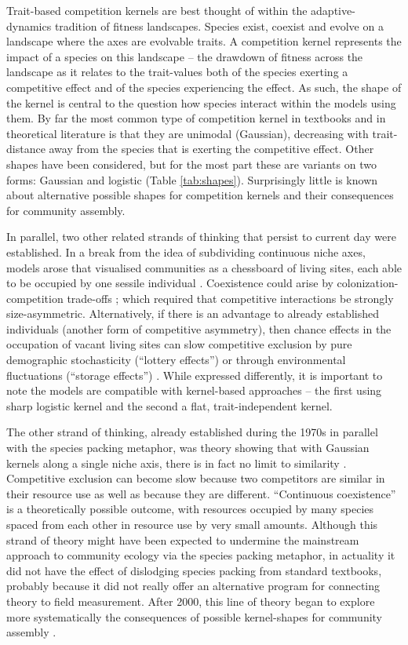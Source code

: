 \documentclass[a4paper,11pt]{article}
\begin{document}
Trait-based competition kernels are best thought of within the adaptive-
dynamics tradition of fitness landscapes. Species exist, coexist and evolve on
a landscape where the axes are evolvable traits. A competition kernel
represents the impact of a species on this landscape -- the drawdown of
fitness across the landscape as it relates to the trait-values both of the
species exerting a competitive effect and of the species experiencing the
effect. As such, the shape of the kernel is central
to the question how species interact within the models using them.
 By far the most common type of
competition kernel in textbooks and in theoretical literature is that they are
unimodal (Gaussian), decreasing with trait-distance away from the species that
is exerting the competitive effect. Other shapes have been considered,
but for the most part these are variants on two forms: Gaussian and logistic
(Table \ref{tab:shapes}). Surprisingly little is known about
alternative possible shapes for competition kernels and their consequences for
community assembly.

In parallel, two other related strands of thinking that persist to current
day were established. In a break from the idea of subdividing continuous
niche axes, models arose
that visualised communities as a chessboard of living sites, each able to be
occupied by one sessile individual \citep{Yodzis-1978}. Coexistence could
arise by colonization-competition trade-offs \citep{Levins-1971,
Geritz-1999, Calcagno-2006}; which required that competitive interactions
be strongly size-asymmetric. Alternatively, if there is an advantage to 
already established individuals (another form of competitive asymmetry),
then chance effects in the occupation of vacant living sites can slow
competitive exclusion by pure demographic stochasticity (``lottery
effects'')
\citep {Sale-1977, Hubbell-2001} or through environmental fluctuations
(``storage effects'') \citep{Chesson-1981}. While expressed differently,
it is important to note the models are compatible with kernel-based 
approaches -- the first using sharp logistic kernel and the second a 
flat, trait-independent kernel. 

The other strand of thinking, already established during the 1970s in parallel
with the species packing metaphor, was theory showing that with Gaussian
kernels along a single niche axis, there is in fact no limit to similarity
\citep{May-1972, Abrams-1975, Abrams-1983}. Competitive exclusion can become
slow because two competitors are similar in their resource use as well as
because they are different. ``Continuous coexistence'' is a theoretically
possible outcome, with resources occupied by many species spaced from each
other in resource use by very small amounts. Although this strand of theory
might have been expected to undermine the mainstream approach to community
ecology via the species packing metaphor, in actuality it did not have the
effect of dislodging species packing from standard textbooks, probably because
it did not really offer an alternative program for connecting theory to field
measurement.  After 2000, this line of theory began to explore more
systematically the consequences of possible kernel-shapes for community
assembly \citep{Scheffer-2006, Barabas-2013, Leimar-2013}.
\end{document}
